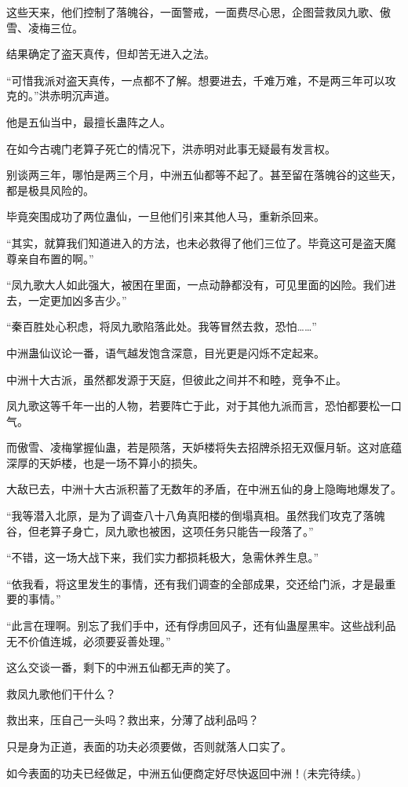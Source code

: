 \begin{this_body}
这些天来，他们控制了落魄谷，一面警戒，一面费尽心思，企图营救凤九歌、傲雪、凌梅三位。

结果确定了盗天真传，但却苦无进入之法。

“可惜我派对盗天真传，一点都不了解。想要进去，千难万难，不是两三年可以攻克的。”洪赤明沉声道。

他是五仙当中，最擅长蛊阵之人。

在如今古魂门老算子死亡的情况下，洪赤明对此事无疑最有发言权。

别谈两三年，哪怕是两三个月，中洲五仙都等不起了。甚至留在落魄谷的这些天，都是极具风险的。

毕竟突围成功了两位蛊仙，一旦他们引来其他人马，重新杀回来。

“其实，就算我们知道进入的方法，也未必救得了他们三位了。毕竟这可是盗天魔尊亲自布置的啊。”

“凤九歌大人如此强大，被困在里面，一点动静都没有，可见里面的凶险。我们进去，一定更加凶多吉少。”

“秦百胜处心积虑，将凤九歌陷落此处。我等冒然去救，恐怕……”

中洲蛊仙议论一番，语气越发饱含深意，目光更是闪烁不定起来。

中洲十大古派，虽然都发源于天庭，但彼此之间并不和睦，竞争不止。

凤九歌这等千年一出的人物，若要阵亡于此，对于其他九派而言，恐怕都要松一口气。

而傲雪、凌梅掌握仙蛊，若是陨落，天妒楼将失去招牌杀招无双偃月斩。这对底蕴深厚的天妒楼，也是一场不算小的损失。

大敌已去，中洲十大古派积蓄了无数年的矛盾，在中洲五仙的身上隐晦地爆发了。

“我等潜入北原，是为了调查八十八角真阳楼的倒塌真相。虽然我们攻克了落魄谷，但老算子身亡，凤九歌也被困，这项任务只能告一段落了。”

“不错，这一场大战下来，我们实力都损耗极大，急需休养生息。”

“依我看，将这里发生的事情，还有我们调查的全部成果，交还给门派，才是最重要的事情。”

“此言在理啊。别忘了我们手中，还有俘虏回风子，还有仙蛊屋黑牢。这些战利品无不价值连城，必须要妥善处理。”

这么交谈一番，剩下的中洲五仙都无声的笑了。

救凤九歌他们干什么？

救出来，压自己一头吗？救出来，分薄了战利品吗？

只是身为正道，表面的功夫必须要做，否则就落人口实了。

如今表面的功夫已经做足，中洲五仙便商定好尽快返回中洲！(未完待续。)

\end{this_body}

